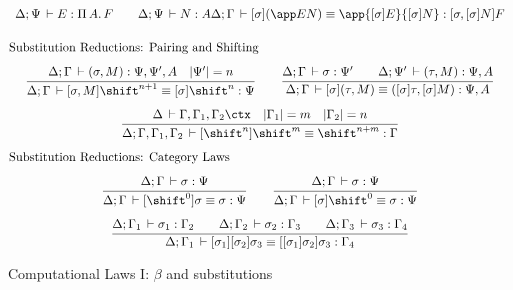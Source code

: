 \documentclass[copyright,creativecommons]{eptcs}
\makeatletter
\newcommand{\der}{\,\vdash}
\newcommand{\length}[1]{|#1|}
\newcommand{\ru}[2]{\dfrac{\begin{array}[b]{@{}c@{}} #1 \end{array}}{#2}}
\newcommand{\cxt}{\ctx}  \newcommand{\mcxt}{\mctx}
\newcommand{\shiftby}[1]{\shift^{#1}}
\newcommand{\esub}[1]{[#1]}
\newcommand{\esubp}[2]{[#1](#2)}
\newcommand{\abox}[1]{\multicolumn 1 {@{}p{\textwidth}@{}} {#1}}
\makeatother
\begin{document}
\begin{figure}
\[\begin{array}[h]{c}
{    \Delta; \Psi \der E : \fun A F \qquad
    \Delta; \Psi \der N : A
  }{\Delta; \Gamma \der \esubp \sigma {\app E N} \equiv 
      \app {\esub \sigma E} {\esub \sigma N} : \esub {\sigma, \esub
        \sigma N} F
  }
\\[1.5em]
\abox{Substitution Reductions: Pairing and Shifting\hspace{12cm}}
\\[0.75em]
\ru{\Delta; \Gamma \der (\sigma,M) : \Psi, \Psi', A \quad
    \length{\Psi'} = n
  }{\Delta; \Gamma \der \esub {\sigma, M} {\shiftby {n+1}} \equiv
    \esub \sigma {\shiftby n} : \Psi } 
\qquad
\ru{\Delta; \Gamma \der \sigma : \Psi' \qquad
    \Delta; \Psi' \der (\tau,M) : \Psi, A
  }{\Delta; \Gamma \der \esub \sigma (\tau, M) 
     \equiv (\esub \sigma \tau, \esub \sigma M) : \Psi, A}
\\[1.5em]
\ru{\Delta \der \Gamma,\Gamma_1,\Gamma_2 \cxt \quad
    \length{\Gamma_1} = m \quad 
    \length{\Gamma_2} = n
  }{\Delta; \Gamma,\Gamma_1,\Gamma_2 \der \esub {\shiftby n}
    {\shiftby m} \equiv \shiftby{n+m} : \Gamma 
  }
\\[1.5em]
\abox{Substitution Reductions: Category Laws\hspace{12cm}}
\\[0.75em]
\ru{\Delta; \Gamma \der \sigma : \Psi
  }{\Delta; \Gamma \der \esub {\shiftby 0} \sigma \equiv \sigma : \Psi}
\qquad
\ru{\Delta; \Gamma \der \sigma : \Psi
  }{\Delta; \Gamma \der \esub \sigma {\shiftby 0}  \equiv \sigma : \Psi}
\\[1.5em]
\ru{\Delta; \Gamma_1 \der \sigma_1 : \Gamma_2 \qquad
    \Delta; \Gamma_2 \der \sigma_2 : \Gamma_3 \qquad
    \Delta; \Gamma_3 \der \sigma_3 : \Gamma_4 
  }{\Delta; \Gamma_1 \der \esub {\sigma_1} \esub {\sigma_2}
    {\sigma_3} \equiv \esub {\esub {\sigma_1}{\sigma_2}} {\sigma_3} : \Gamma_4
   }
\end{array}
\]
  
  \caption{Computational Laws I: $\beta$ and substitutions}
  \label{fig:cl1}
\end{figure}
\end{document}
